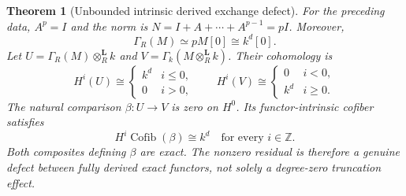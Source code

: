 \documentclass[11pt]{article}
\newtheorem{theorem}{Theorem}[section]
\theoremstyle{definition}
\theoremstyle{remark}
\newcommand{\Cofib}{\operatorname{Cofib}}
\begin{document}
\begin{theorem}[Unbounded intrinsic derived exchange defect]\label{thm:nonflat-invariant-exchange}
For the preceding data, $A^p=I$ and the norm is $N=I+A+\cdots+A^{p-1}=pI$. Moreover,
\[
 \Gamma_R(M)\simeq pM[0]\cong k^d[0].
\]
Let $U=\Gamma_R(M)\otimes_R^{\mathbf L}k$ and $V=\Gamma_k(M\otimes_R^{\mathbf L}k)$. Their cohomology is
\[
 H^i(U)\cong\begin{cases}k^d&i\leq0,\\0&i>0,\end{cases}
 \qquad
 H^i(V)\cong\begin{cases}0&i<0,\\k^d&i\geq0.\end{cases}
\]
The natural comparison $\beta:U\to V$ is zero on $H^0$. Its functor-intrinsic cofiber satisfies
\[
 \boxed{H^i\Cofib(\beta)\cong k^d\quad\text{for every }i\in\mathbb Z.}
\]
Both composites defining $\beta$ are exact. The nonzero residual is therefore a genuine defect between fully derived exact functors, not solely a degree-zero truncation effect.
\end{theorem}
\end{document}
